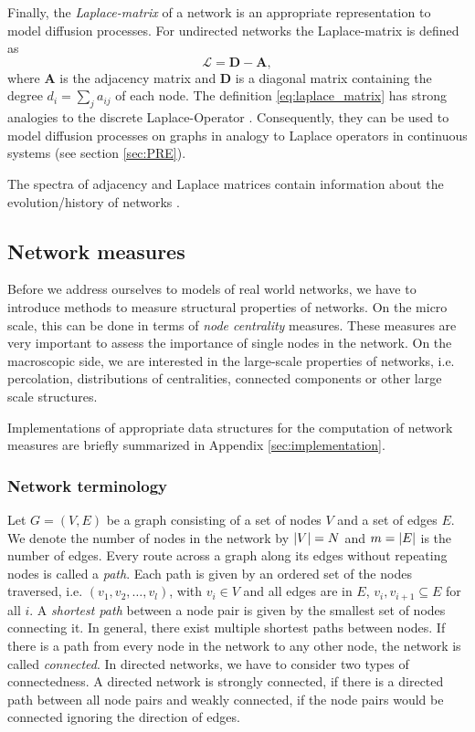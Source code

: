 Finally, the \emph{Laplace-matrix} of a network is an appropriate representation to model diffusion processes.
For undirected networks the Laplace-matrix is defined as
\begin{equation}\label{eq:laplace_matrix}
\mathcal{L}=\mathbf{D}-\mathbf{A},
\end{equation}
where $\mathbf{A}$ is the adjacency matrix and $\mathbf{D}$ is a diagonal matrix containing the degree $d_i=\sum _j a_{ij}$ of each node.
The definition \eqref{eq:laplace_matrix} has strong analogies to the discrete Laplace-Operator \citep{Press:1992}.
Consequently, they can be used to model diffusion processes on graphs in analogy to Laplace operators in continuous systems (see section \ref{sec:PRE}).

The spectra of adjacency and Laplace matrices contain information about the evolution/history of networks \citep{Banerjee2009}.


\subsection{Network measures}\label{sec:network_measures}
Before we address ourselves to models of real world networks, we have to introduce methods to measure structural properties of networks.
On the micro scale, this can be done in terms of \emph{node centrality} measures.
These measures are very important to assess the importance of single nodes in the network.
On the macroscopic side, we are interested in the large-scale properties of networks, i.e. percolation, distributions of centralities, connected components or other large scale structures.

Implementations of appropriate data structures for the computation of network measures are briefly summarized in Appendix \ref{sec:implementation}.

\subsubsection{Network terminology}\label{sec:network_terminology}
Let $G=(V,E)$ be a graph consisting of a set of nodes $V$ and a set of edges $E$.
We denote the number of nodes in the network by $\left| V \right|=N$ and $m=\left| E \right|$ is the number of edges.
Every route across a graph along its edges without repeating nodes is called a \emph{path}.
Each path is given by an ordered set of the nodes traversed, i.e. $(v_1,v_2,\dots ,v_l)$, with $v_i \in V$ and all edges are in $E$, $v_i,v_{i+1} \subseteq E$ for all $i$.
A \emph{shortest path} between a node pair is given by the smallest set of nodes connecting it.
In general, there exist multiple shortest paths between nodes.
If there is a path from every node in the network to any other node, the network is called \emph{connected}.
In directed networks, we have to consider two types of connectedness.
A directed network is strongly connected, if there is a directed path between all node pairs and weakly connected, if the node pairs would be connected ignoring the direction of edges.

